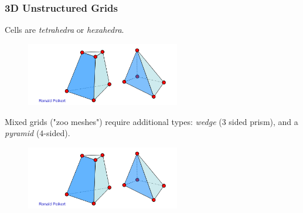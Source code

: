 \subsubsection{3D Unstructured Grids}
Cells are \emph{tetrahedra} or \emph{hexahedra}.
\begin{figure}[H]
\centering
\includegraphics[width=0.6\textwidth,page=2]{img/01_3d_unstructured_grids}
\end{figure}
Mixed grids ("zoo meshes") require additional types:
\emph{wedge} ($3$ sided prism), and a \emph{pyramid} ($4$-sided).
\begin{figure}[H]
\centering
\includegraphics[width=0.6\textwidth,page=1]{img/01_3d_unstructured_grids}
\end{figure}

